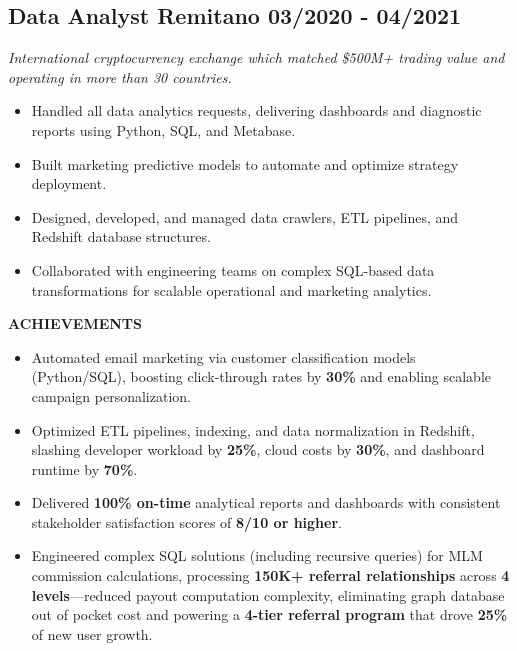\documentclass[11pt,a4paper]{article}
\begin{document}
\begin{mdframed}[style=dashedleft]
\begin{itemize}[leftmargin=1.5em, itemsep=4pt]
\end{itemize}

\vspace{4pt}

\subsection*{Data Analyst \hfill \textbf{Remitano} \hfill 03/2020 - 04/2021}
\textit{International cryptocurrency exchange which matched \$500M+ trading value and operating in more than 30 countries.}

\begin{itemize}[leftmargin=1.5em, itemsep=4pt]
    \item Handled all data analytics requests, delivering dashboards and diagnostic reports using Python, SQL, and Metabase.
    \item Built marketing predictive models to automate and optimize strategy deployment.
    \item Designed, developed, and managed data crawlers, ETL pipelines, and Redshift database structures.
    \item Collaborated with engineering teams on complex SQL-based data transformations for scalable operational and marketing analytics.
\end{itemize}

\textbf{ACHIEVEMENTS}
\begin{itemize}[leftmargin=1.5em, itemsep=4pt]
    \item Automated email marketing via customer classification models (Python/SQL), boosting click-through rates by \textbf{30\%} and enabling scalable campaign personalization.
    \item Optimized ETL pipelines, indexing, and data normalization in Redshift, slashing developer workload by \textbf{25\%}, cloud costs by \textbf{30\%}, and dashboard runtime by \textbf{70\%}.
    \item Delivered \textbf{100\% on-time} analytical reports and dashboards with consistent stakeholder satisfaction scores of \textbf{8/10 or higher}.
    \item Engineered complex SQL solutions (including recursive queries) for MLM commission calculations, processing \textbf{150K+ referral relationships} across \textbf{4 levels}—reduced payout computation complexity, eliminating graph database out of pocket cost and powering a \textbf{4-tier referral program} that drove \textbf{25\%} of new user growth.
\end{itemize}


\end{mdframed}
\end{document}
